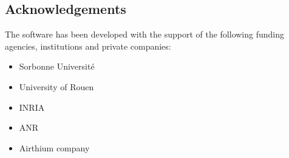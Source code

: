 \subsection{Acknowledgements}
\label{sec::Freefem++:acknowledgements}

The software has been developed with the support of the following funding agencies, institutions and private companies: 

\begin{itemize}
\item Sorbonne Université
\item University of Rouen
\item INRIA
\item ANR
\item Airthium company
\end{itemize}